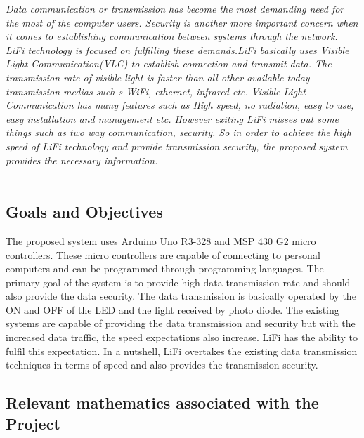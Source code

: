 \documentclass[12pt,a4paper]
{article}
\numberwithin{table}{section}
\begin{document}
{\hspace{0.7 in}\textit{Data communication or transmission has become the most demanding need for the most of the computer users. Security is another more important concern when it comes to establishing communication between systems through the network. LiFi technology is focused on fulfilling  these demands.LiFi basically uses Visible Light Communication(VLC) to establish connection and transmit data. The transmission rate of visible light is faster than all other available today transmission medias such s WiFi, ethernet, infrared etc. Visible Light Communication has many features such as High speed, no radiation, easy to use, easy installation and management etc. However exiting  LiFi misses out some things such as two way communication, security. So in order to achieve the high speed of LiFi technology and provide transmission security, the proposed system provides the necessary information.}  }\\
\\
\subsection{Goals and Objectives}
The proposed system uses Arduino Uno R3-328 and MSP 430 G2 micro controllers. These micro controllers are capable of connecting to personal computers and can be programmed through programming languages.
	The primary goal of the system  is to provide high data transmission rate and should also provide the data security. The data transmission is basically operated by the ON and OFF of the LED and the light received by photo diode. The existing systems are capable of providing the data transmission and security but with the increased data traffic, the speed expectations also increase. LiFi has the ability to fulfil this expectation.
	In a nutshell, LiFi overtakes the existing data transmission techniques in terms of speed and also  provides the transmission security.



\subsection{Relevant mathematics associated with the Project}
\label{sec:math}
\end{document}
